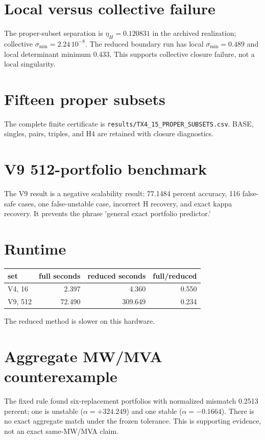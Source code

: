 \documentclass[10pt]{article}
\begin{document}
\section{Local versus collective failure}
The proper-subset separation is $\eta_H=0.120831$ in the archived
realization; collective $\sigma_{\min}=2.24\,10^{-8}$. The reduced boundary
run has local $\sigma_{\min}=0.489$ and local determinant minimum 0.433.
This supports collective closure failure, not a local singularity.

\section{Fifteen proper subsets}
The complete finite certificate is
\texttt{results/TX4\_15\_PROPER\_SUBSETS.csv}. BASE, singles, pairs, triples,
and H4 are retained with closure diagnostics.

\section{V9 512-portfolio benchmark}
The V9 result is a negative scalability result: 77.1484 percent accuracy,
116 false-safe cases, one false-unstable case, incorrect H recovery, and
exact kappa recovery. It prevents the phrase 'general exact portfolio
predictor.'

\section{Runtime}
\begin{center}
\begin{tabular}{lrrr}
\toprule
set & full seconds & reduced seconds & full/reduced\\
\midrule
V4, 16 & 2.397 & 4.360 & 0.550\\
V9, 512 & 72.490 & 309.649 & 0.234\\
\bottomrule
\end{tabular}
\end{center}
The reduced method is slower on this hardware.

\section{Aggregate MW/MVA counterexample}
The fixed rule found six-replacement portfolios with normalized mismatch
0.2513 percent; one is unstable ($\alpha=+324.249$) and one stable
($\alpha=-0.1664$). There is no exact aggregate match under the frozen
tolerance. This is supporting evidence, not an exact same-MW/MVA claim.
\end{document}
